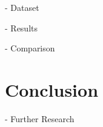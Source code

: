 \documentclass[tuberlin,cic,tc,openright,english,noabntcite]{iiufrgs}
\begin{document}
- Dataset

- Results

- Comparison

\chapter{Conclusion}
- Further Research

% 

% 

\nocite{*}
%
\printbibliography
\end{document}
